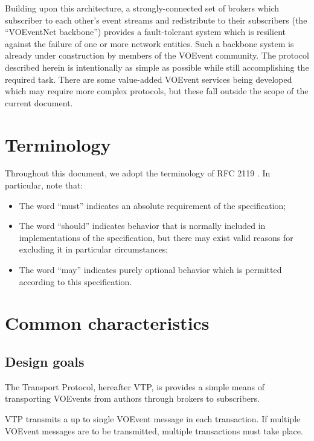\documentclass[a4paper,11pt]{ivoa}
\begin{document}
Building upon this architecture, a strongly-connected set of brokers which
subscriber to each other's event streams and redistribute to their subscribers
(the ``VOEventNet backbone'') provides a fault-tolerant system which is
resilient against the failure of one or more network entities. Such a backbone
system is already under construction by members of the VOEvent community.  The
protocol described herein is intentionally as simple as possible while still
accomplishing the required task. There are some value-added VOEvent services
being developed which may require more complex protocols, but these fall
outside the scope of the current document.

\section{Terminology}

Throughout this document, we adopt the terminology of RFC 2119
\citep{Bradner:1997}. In particular, note that:

\begin{itemize}
    \item{The word ``must'' indicates an absolute requirement of the
    specification;}

    \item{The word ``should'' indicates behavior that is normally included in
    implementations of the specification, but there may exist valid reasons
    for excluding it in particular circumstances;}

    \item{The word ``may'' indicates purely optional behavior which is
    permitted according to this specification.}
\end{itemize}

\section{Common characteristics}

\subsection{Design goals}

The Transport Protocol, hereafter VTP, is provides a simple means of
transporting VOEvents from authors through brokers to subscribers.

VTP transmits a up to single VOEvent message in each transaction. If multiple
VOEvent messages are to be transmitted, multiple transactions must take place.
\end{document}
